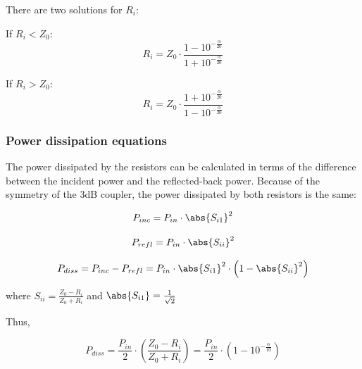 \nointent There are two solutions for $R_i$:
\bigskip

\noindent If $R_i < Z_0$:
\begin{equation}
R_i = Z_0 \cdot \dfrac{1 - 10^{-\frac{\alpha}{20}}}{1 + 10^{-\frac{\alpha}{20}}}
\end{equation}

\noindent If $R_i > Z_0$:
\begin{equation}
R_i = Z_0 \cdot \dfrac{1 + 10^{-\frac{\alpha}{20}}}{1 - 10^{-\frac{\alpha}{20}}}
\end{equation}

\subsubsection{Power dissipation equations}

The power dissipated by the resistors can be calculated in terms of the difference between the incident power and the reflected-back power.
Because of the symmetry of the 3dB coupler, the power dissipated by both resistors is the same:

\begin{equation}
P_{inc} = P_{in} \cdot \abs{S_{i1}}^2
\end{equation}

\begin{equation}
P_{refl} = P_{in} \cdot \abs{S_{ii}}^2
\end{equation}

\begin{equation}
P_{diss} = P_{inc} - P_{refl} = P_{in} \cdot \abs{S_{i1}}^2 \cdot \left( 1 - \abs{S_{ii}}^2\right)
\end{equation}

\noindent where $S_{ii} = \frac{Z_0 - R_i}{Z_0 + R_i}$ and $\abs{S_{i1}} = \frac{1}{\sqrt{2}}$

\noindent Thus, 

\begin{equation}
P_{diss} = \dfrac{P_{in}}{2} \cdot \left( \dfrac{Z_0 - R_i}{Z_0 + R_i}\right) = \dfrac{P_{in}}{2} \cdot \left( 1 - 10^{-\frac{\alpha}{10}}\right)
\end{equation}




